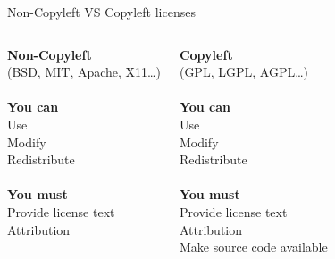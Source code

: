 \begin{frame}{Non-Copyleft VS Copyleft licenses}
  \begin{columns}

      \begin{center}
        {\bf Non-Copyleft}\\
        (BSD, MIT, Apache, X11\dots)\\
      {\ }\\
      {\bf You can}\\
      Use\\
      Modify\\
      Redistribute\\
      {\ }\\
      {\bf You must}\\
      Provide license text \\
      Attribution \\
      {\ }
      \end{center}

      \begin{center}
        {\bf Copyleft} \\
        (GPL, LGPL, AGPL\dots)\\
      {\ }\\
      {\bf You can}\\
      Use\\
      Modify\\
      Redistribute\\
      {\ }\\
      {\bf You must}\\
      Provide license text \\
      Attribution \\
      Make source code available
       \end{center}

  \end{columns}
\end{frame}

